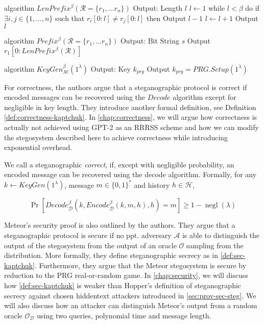 \begin{Pseudocode}[caption={Meteor LenPrefix Algorithm, \cite{Meteor2021}}]
algorithm $LenPrefix^\beta(\mathcal R = \{ r_1, \dots r_n \})$
	Output: Length $l$
	$l \leftarrow 1$
	while $l < \beta$ do
		if $\exists i, j \in \{ 1, \dots, n \}$ such that $r_i[0: l] \neq r_j[0:	l]$ then
			Output $l-1$
		$l \leftarrow l+1$
	Output $l$
\end{Pseudocode}%
%
\begin{Pseudocode}[caption={Meteor Prefix Algorithm, \cite{Meteor2021}}]
algorithm $Prefix^\beta(	\mathcal R = \{ r_1, \dots r_n \})$
	Output: Bit String $s$
	Output $r_1[0: LenPrefix^\beta(\mathcal{R})]$
\end{Pseudocode}%
%
\begin{Pseudocode}[caption={Meteor KeyGen Algorithm, \cite{Meteor2021}}]
algorithm $KeyGen_{\mathcal{M}}^\beta(1^\lambda)$
	Output: Key $k_{prg}$
	Output $k_{prg} = PRG.Setup(1^\lambda)$
\end{Pseudocode}

For correctness, the authors argue that a steganographic protocol is correct if encoded messages can be recovered using the $Decode$ algorithm except for negligible in key length.
They introduce another formal definition, see Definition \autoref{def:correctness-kaptchuk}.
In \autoref{chap:correctness}, we will argue how correctness is actually not achieved using GPT-2 as an RRRSS scheme and how we can modify the stegosystem described here to achieve correctness while introducing exponential overhead.

\begin{definition}
\label{def:correctness-kaptchuk}
We call a steganographic \emph{correct}, if, except with negligible probability, an encoded message can be recovered using the decode algorithm. 
Formally, for any $k \leftarrow KeyGen(1^\lambda)$, message $m \in \{0,1\}^*$ and history $h \in \mathcal{H}$,

$$\mathop{Pr}[Decode_{\mathcal{D}}^\beta(k, Encode_{\mathcal{D}}^\beta(k, m, h), h) = m] \geq 1 - \mathop{negl}(\lambda)$$
\end{definition}

Meteor's security proof is also outlined by the authors.
They argue that a steganographic protocol is secure if no ppt. adversary $\mathcal{A}$ is able to distinguish the output of the stegosystem from the output of an oracle $\mathcal{O}$ sampling from the distribution.
More formally, they define steganographic secrecy as in \autoref{def:sec-kaptchuk}.
Furthermore, they argue that the Meteor stegosystem is secure by reduction to the PRG real-or-random game. 
In \autoref{chap:security}, we will discuss how \autoref{def:sec-kaptchuk} is weaker than Hopper's definition of steganographic secrecy against chosen hiddentext attackers introduced in \autoref{sec:prov-sec-steg}.
We will also discuss how an attacker can distinguish Meteor's output from a random oracle $\mathcal{O}_{\mathcal{D}}$ using two queries, polynomial time and message length.


